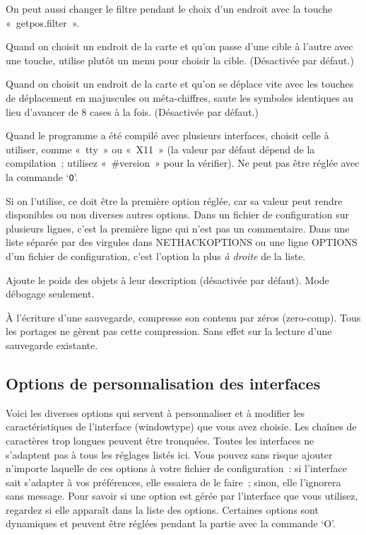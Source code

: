 \documentclass[titlepage]{article}
\begin{document}
\begin{description}
On peut aussi changer le filtre pendant le choix d'un endroit avec la
touche «~getpos.filter~».

\item[{whatis\_menu}]
Quand on choisit un endroit de la carte et qu'on passe d'une cible à
l'autre avec une touche, utilise plutôt un menu pour choisir la cible.
(Désactivée par défaut.)

\item[{whatis\_moveskip}]
Quand on choisit un endroit de la carte et qu'on se déplace vite avec les
touches de déplacement en majuscules ou méta-chiffres, saute les symboles
identiques au lieu d'avancer de 8 cases à la fois.
(Désactivée par défaut.)

\item[{windowtype}]
Quand le programme a été compilé avec plusieurs interfaces, choisit celle
à utiliser, comme «~tty~» ou «~X11~» (la valeur par défaut
dépend de la compilation~; utilisez «~\#version~» pour la vérifier).
Ne peut pas être réglée avec la commande `\texttt{O}'.


Si on l'utilise, ce doit être la première option réglée, car sa valeur peut
rendre disponibles ou non diverses autres options.
Dans un fichier de configuration sur plusieurs lignes, c'est la première
ligne qui n'est pas un commentaire.
Dans une liste séparée par des virgules dans NETHACKOPTIONS ou une ligne
OPTIONS d'un fichier de configuration, c'est l'option la plus \textit{à
droite} de la liste.

\item[{wizweight}]
Ajoute le poids des objets à leur description (désactivée par défaut).
Mode débogage seulement.

\item[{zerocomp}]
À l'écriture d'une sauvegarde, compresse son contenu par zéros
(zero-comp).
Tous les portages ne gèrent pas cette compression.
Sans effet sur la lecture d'une sauvegarde existante.

\end{description}
\subsection{Options de personnalisation des interfaces}



Voici les diverses options qui servent à personnaliser et à modifier les
caractéristiques de l'interface (windowtype) que vous avez choisie.
Les chaînes de caractères trop longues peuvent être tronquées.
Toutes les interfaces ne s'adaptent pas à tous les réglages listés ici.
Vous pouvez sans risque ajouter n'importe laquelle de ces options à votre
fichier de configuration~: si l'interface sait s'adapter à vos
préférences, elle essaiera de le faire~; sinon, elle l'ignorera sans
message.
Pour savoir si une option est gérée par l'interface que vous utilisez,
regardez si elle apparaît dans la liste des options.
Certaines options sont dynamiques et peuvent être réglées pendant la
partie avec la commande `O'.
\end{document}
